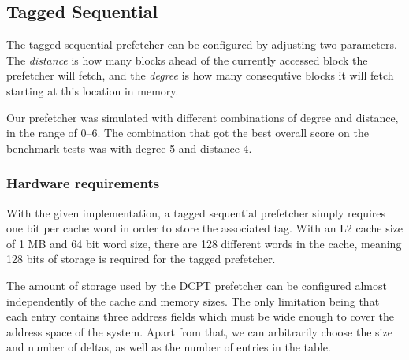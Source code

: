 \subsection{Tagged Sequential}

The tagged sequential prefetcher can be configured by adjusting two parameters.
The \emph{distance} is how many blocks ahead of the currently accessed block the
prefetcher will fetch, and the \emph{degree} is how many consequtive blocks it will
fetch starting at this location in memory.

Our prefetcher was simulated with different combinations of degree and distance,
in the range of 0--6. The combination that got the best overall score on the
benchmark tests was with degree 5 and distance 4.

\subsubsection{Hardware requirements}

With the given implementation, a tagged sequential prefetcher simply requires
one bit per cache word in order to store the associated tag. With an L2 cache
size of 1 MB and 64 bit word size, there are 128 different words in the cache,
meaning 128 bits of storage is required for the tagged prefetcher.

The amount of storage used by the DCPT prefetcher can be configured almost
independently of the cache and memory sizes. The only limitation being that each
entry contains three address fields which must be wide enough to cover the address
space of the system. Apart from that, we can arbitrarily choose the size and
number of deltas, as well as the number of entries in the table.

